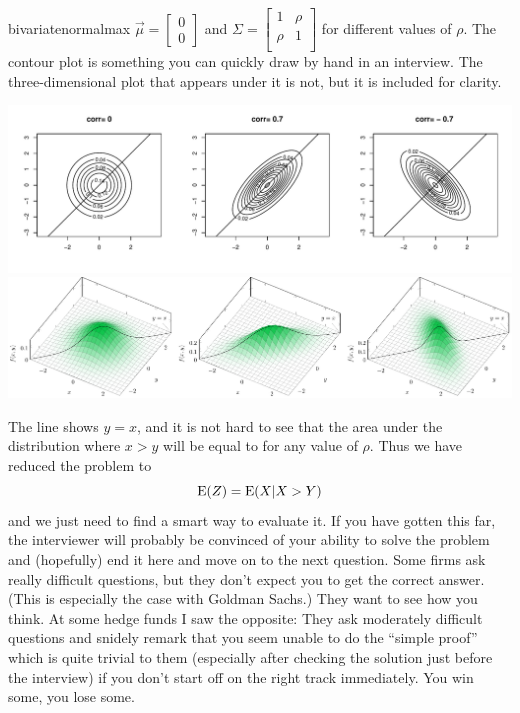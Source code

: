 \begin{answer}{bivariatenormalmax}
$\vec{\mu}=
\begin{bmatrix}
  0    \\
  0
\end{bmatrix}
$ and
$\Sigma =
\begin{bmatrix}
  1    & \rho \\
  \rho & 1    \\
\end{bmatrix}$
for different values of $\rho$.
The contour plot is something you can quickly draw by hand in an interview.
The three-dimensional plot that appears under it is not, but it is included for clarity.
\begin{center}
  \includegraphics[width=\textwidth]{./plots/mvtnorm/mvrnorm.pdf}
  \includegraphics[width=\textwidth]{./plots/bivariatenorm/bivariatenorm.pdf}
\end{center}
The line shows $y=x$, and it is not hard to see that the area under the distribution where $x>y$ will be equal to  for any value of $\rho$.
Thus we have reduced the problem to
\[
\operatorname{\mathrm{E}}(Z) =  \operatorname{\mathrm{E}}(X|X > Y)
\]
and we just need to find a smart way to evaluate it.
If you have gotten this far, the interviewer will probably be convinced of your ability to solve the problem and (hopefully) end it here and move on to the next question.
Some firms  ask really difficult questions, but they don't expect you to get the correct answer.
(This is especially the case with Goldman Sachs.)
They want to see how you think.
At some hedge funds I saw the opposite: They ask moderately difficult questions and snidely remark that you seem unable to do the ``simple proof'' which is quite trivial to them (especially after checking the solution just before the interview) if you don't start off on the right track immediately.
You win some, you lose some.


\end{answer}
